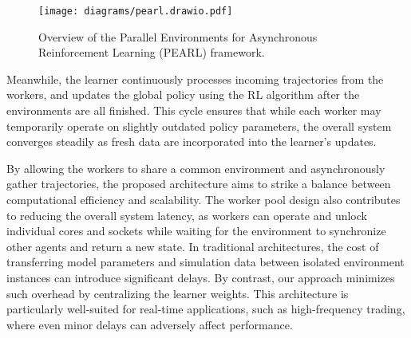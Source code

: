     \begin{figure}[htb]
        \centering
        \texttt{[image: diagrams/pearl.drawio.pdf]}
        \caption{Overview of the Parallel Environments for Asynchronous Reinforcement Learning (PEARL) framework.}
        \label{fig:pearl_architecture}
    \end{figure}

    Meanwhile, the learner continuously processes incoming trajectories from the workers,
    and updates the global policy using the RL algorithm after the environments are all finished.
    This cycle ensures that while each worker may temporarily operate on slightly outdated policy parameters,
    the overall system converges steadily as fresh data are incorporated into the learner's updates.

    By allowing the workers to share a common environment and asynchronously gather trajectories,
    the proposed architecture aims to strike a balance between computational efficiency and scalability.
    The worker pool design also contributes to reducing the overall system latency,
    as workers can operate and unlock individual cores and sockets while waiting for the environment to synchronize other agents and return a new state.
    In traditional architectures, the cost of transferring model parameters and simulation data between isolated environment instances can introduce significant delays.
    By contrast, our approach minimizes such overhead by centralizing the learner weights.
    This architecture is particularly well-suited for real-time applications, such as high-frequency trading,
    where even minor delays can adversely affect performance.

